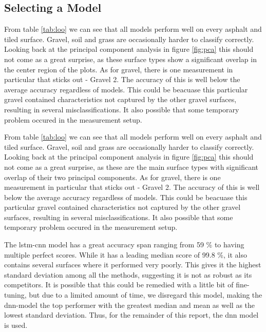 \subsection{Selecting a Model}

From table \ref{tab:loo} we can see that all models perform well on every asphalt and tiled surface. Gravel, soil and grass are occasionally harder to classify correctly. Looking back at the principal component analysis in figure \ref{fig:pca} this should not come as a great surprise, as these surface types show a significant overlap in the center region of the plots. As for gravel, there is one measurement in particular that sticks out - Gravel 2. The accuracy of this is well below the average accuracy regardless of models. This could be beacuase this particular gravel contained characteristics not captured by the other gravel surfaces, resulting in several misclassifications. It also possible that some temporary problem occured in the measurement setup.

From table \ref{tab:loo} we can see that all models perform well on every asphalt and tiled surface. Gravel, soil and grass are occasionally harder to classify correctly. Looking back at the principal component analysis in figure \ref{fig:pca} this should not come as a great surprise, as these are the main surface types with significant overlap of their two principal components. As for gravel, there is one measurement in particular that sticks out - Gravel 2. The accuracy of this is well below the average accuracy regardless of models. This could be beacuase this particular gravel contained characteristics not captured by the other gravel surfaces, resulting in several misclassifications. It also possible that some temporary problem occured in the measurement setup.

The \gls{lstm}-\gls{cnn} model has a great accuracy span ranging from 59 \% to having multiple perfect scores. While it has a leading median score of 99.8 \%, it also contains several surfaces where it performed very poorly. This gives it the highest standard deviation among all the methods, suggesting it is not as robust as its competitors. It is possible that this could be remedied with a little bit of fine-tuning, but due to a limited amount of time, we disregard this model, making the \gls{dnn}-model the top performer with the greatest median and mean as well as the lowest standard deviation. Thus, for the remainder of this report, the \gls{dnn} model is used.







